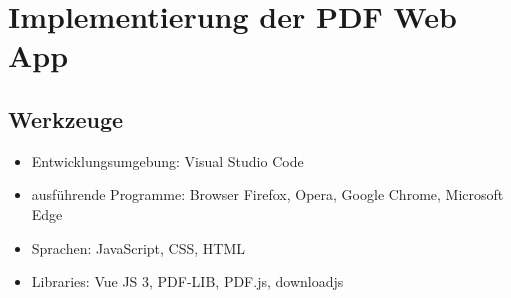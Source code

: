\section{Implementierung der PDF Web App}


\subsection{Werkzeuge}
\begin{itemize}
	\item Entwicklungsumgebung: Visual Studio Code
	\item ausführende Programme: Browser Firefox, Opera, Google Chrome, Microsoft Edge
	\item Sprachen: JavaScript, CSS, HTML
	\item Libraries: Vue JS 3, PDF-LIB, PDF.js, downloadjs
\end{itemize}
